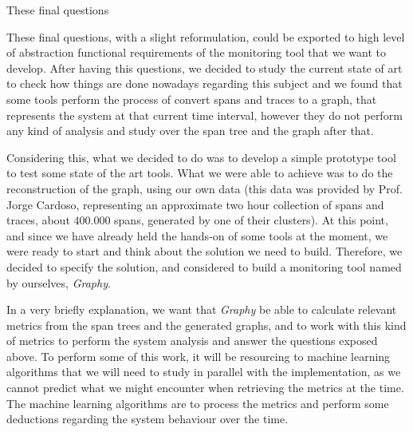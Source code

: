 These final questions










These final questions, with a slight reformulation, could be exported to high level of abstraction functional requirements of the monitoring tool that we want to develop. After having this questions, we decided to study the current state of art to check how things are done nowadays regarding this subject and we found that some tools perform the process of convert spans and traces to a graph, that represents the system at that current time interval, however they do not perform any kind of analysis and study over the span tree and the graph after that\cite{spans_analysis}.

Considering this, what we decided to do was to develop a simple prototype tool to test some state of the art tools. What we were able to achieve was to do the reconstruction of the graph, using our own data (this data was provided by Prof. Jorge Cardoso, representing an approximate two hour collection of spans and traces, about 400.000 spans, generated by one of their clusters). At this point, and since we have already held the hands-on of some tools at the moment, we were ready to start and think about the solution we need to build. Therefore, we decided to specify the solution, and considered to build a monitoring tool named by ourselves, \textit{Graphy}.

In a very briefly explanation, we want that \textit{Graphy} be able to calculate relevant metrics from the span trees and the generated graphs, and to work with this kind of metrics to perform the system analysis and answer the questions exposed above. To perform some of this work, it will be resourcing to machine learning algorithms that we will need to study in parallel with the implementation, as we cannot predict what we might encounter when retrieving the metrics at the time. The machine learning algorithms are to process the metrics and perform some deductions regarding the system behaviour over the time.












\checkoddpage
{}
{ %
    \newpage
    \blankpage}
{ %
}